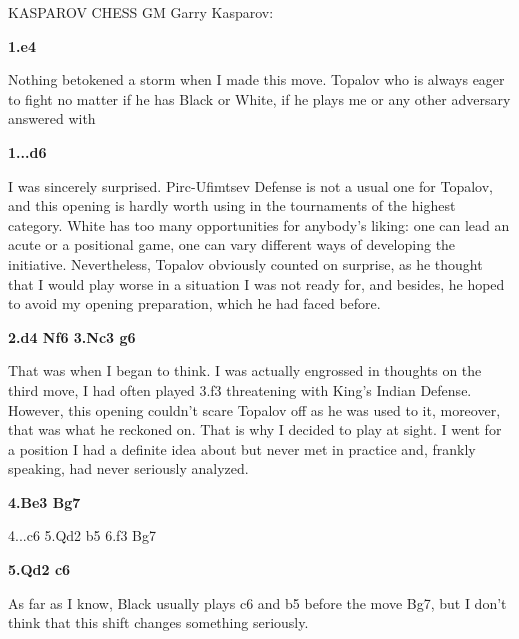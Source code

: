 \documentclass[
	11pt,twocolumn]{article}
\date{\today}
\renewcommand{\bf}{\bfseries}
\newcommand{\nf}{\normalfont}
\newcounter{diagram}[section]
\renewcommand{\maketitle}{
	\begin{center}
			{\sffamily
			\noindent\rule[1.5em]{\textwidth}{1pt}
				\bf Kasparov, Garry  - Topalov, Veselin \\
				\nf ?
			\noindent\rule[-1em]{\textwidth}{1pt}}
	\end{center}	
}
\begin{document}
\sloppy

\setcounter{page}{1}
\pagestyle{plain}

\twocolumn[
  \begin{@twocolumnfalse}
    \maketitle
  \end{@twocolumnfalse}
]







KASPAROV CHESS GM Garry Kasparov:

{\bf 1.e4 }

Nothing betokened a storm when I made this move. Topalov who is always eager to fight no matter if he has Black or White, if he plays me or any other adversary answered with

{\bf 1...d6 }

I was sincerely surprised. Pirc-Ufimtsev Defense is not a usual one for Topalov, and this opening is hardly worth using in the tournaments of the highest category. White has too many opportunities for anybody's liking: one can lead an acute or a positional game, one can vary different ways of developing the initiative. Nevertheless, Topalov obviously counted on surprise, as he thought that I would play worse in a situation I was not ready for, and besides, he hoped to avoid my opening preparation, which he had faced before.

{\bf 2.d4 Nf6 3.Nc3 g6 }

That was when I began to think. I was actually engrossed in thoughts on the third move, I had often played 3.f3 threatening with King's Indian Defense. However, this opening couldn't scare Topalov off as he was used to it, moreover, that was what he reckoned on. That is why I decided to play at sight. I went for a position I had a definite idea about but never met in practice and, frankly speaking, had never seriously analyzed.

{\bf 4.Be3 Bg7 }

4...c6 5.Qd2 b5 6.f3 Bg7

{\bf 5.Qd2 c6 }

As far as I know, Black usually plays c6 and b5 before the move Bg7, but I don't think that this shift changes something seriously.
\end{document}
